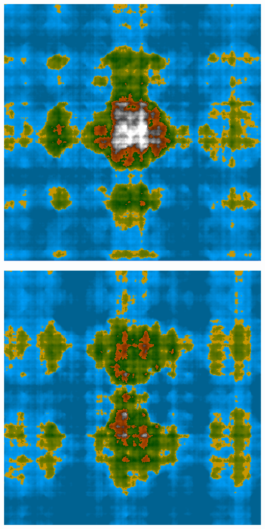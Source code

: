 \documentclass[a4paper, 10pt]{article}
\begin{document}
\begin{center}
\newpage
\includegraphics[scale=0.5]{GPUHash.png}  
  
\bigbreak   
\bigbreak 
\bigbreak 
  
    
\includegraphics[scale=0.5]{GPUSymetrie.png}  

\end{center}
\end{document}
